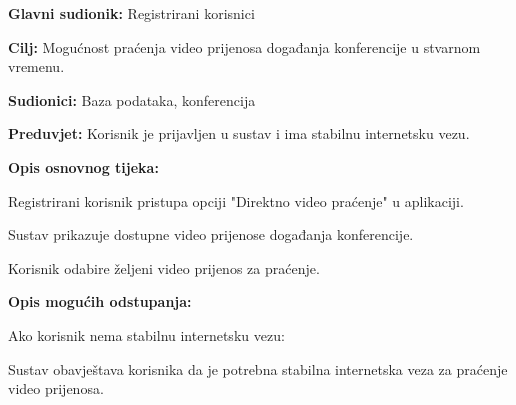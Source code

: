 					
					\noindent {}
					\begin{packed_item}
						\item \textbf{Glavni sudionik:} Registrirani korisnici
						\item \textbf{Cilj:} Mogućnost praćenja video prijenosa događanja konferencije u stvarnom vremenu.
						\item \textbf{Sudionici:} Baza podataka, konferencija
						\item \textbf{Preduvjet:} Korisnik je prijavljen u sustav i ima stabilnu internetsku vezu.
						\item \textbf{Opis osnovnog tijeka:}
						
						\begin{packed_enum}
							\item Registrirani korisnik pristupa opciji "Direktno video praćenje" u aplikaciji.
							\item Sustav prikazuje dostupne video prijenose događanja konferencije.
							\item Korisnik odabire željeni video prijenos za praćenje.
						\end{packed_enum}
						
						\item \textbf{Opis mogućih odstupanja:}
						
						\begin{packed_item}
							\item[2.a] Ako korisnik nema stabilnu internetsku vezu:
							\begin{packed_enum}
								\item Sustav obavještava korisnika da je potrebna stabilna internetska veza za praćenje video prijenosa.
							\end{packed_enum}
						\end{packed_item}
					\end{packed_item}
					
